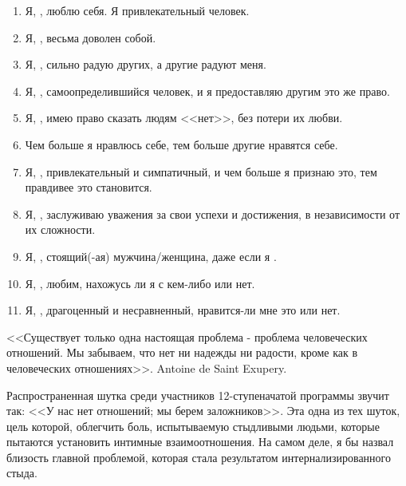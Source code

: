\documentclass[10pt, fleqn]{article}
\begin{document}
\begin{enumerate}
\item Я, \underline{\hspace*{2cm}}, люблю себя. Я привлекательный человек.
\item Я, \underline{\hspace*{2cm}}, весьма доволен собой.
\item Я, \underline{\hspace*{2cm}}, сильно радую других, а другие радуют меня.
\item Я, \underline{\hspace*{2cm}}, самоопределившийся человек, и я предоставляю другим это же право.
\item Я, \underline{\hspace*{2cm}}, имею право сказать людям <<нет>>, без потери их любви.
\item Чем больше я нравлюсь себе, тем больше другие нравятся себе.
\item Я, \underline{\hspace*{2cm}}, привлекательный и симпатичный, и чем больше я признаю это, тем правдивее это становится.
\item Я, \underline{\hspace*{2cm}}, заслуживаю уважения за свои успехи и достижения, в независимости от их сложности.
\item Я, \underline{\hspace*{2cm}}, стоящий(-ая) мужчина/женщина, даже если я \underline{\hspace*{2cm}}.
\item Я, \underline{\hspace*{2cm}}, любим, нахожусь ли я с кем-либо или нет.
\item Я, \underline{\hspace*{2cm}}, драгоценный и несравненный, нравится-ли мне это или нет.
\end{enumerate}


<<Существует только одна настоящая проблема - проблема человеческих отношений. Мы забываем, что нет ни надежды ни радости, кроме как в человеческих отношениях>>. Antoine de Saint Exupery.

Распространенная шутка среди участников 12-ступеначатой программы звучит так: <<У нас нет отношений; мы берем заложников>>. Эта одна из тех шуток, цель которой, облегчить боль, испытываемую стыдливыми людьми, которые пытаются установить интимные взаимоотношения. На самом деле, я бы назвал близость главной проблемой, которая стала результатом интернализированного стыда.
\end{document}
